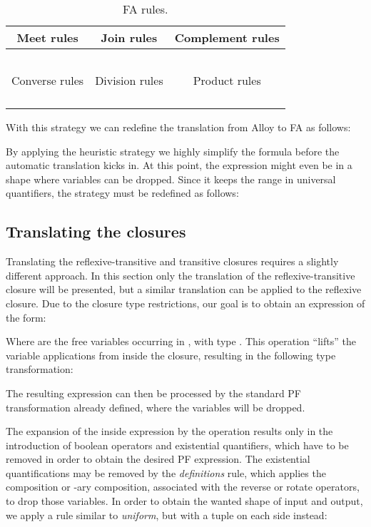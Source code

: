 \documentclass{llncs}
\begin{document}
\begin{table}[t]
\center
\begin{tabular}{|c|c|c|}
\hline
Meet rules & Join rules & Complement rules\\
\hline
 &  &   \\
 &  &  \\
 &  &  \\
 &  &    \\
 &  &   \\
\hline
Converse rules & Division rules & Product rules\\
\hline
 &  &  \\
 &  & \\
 &  &   \\
 &  &  \\
\hline
\end{tabular}
\caption{FA rules.}
\label{tab:rlrules}
\end{table}

With this strategy we can redefine the translation from Alloy to FA as follows:

By applying the heuristic strategy we highly simplify the formula
before the automatic translation kicks in. At this point, the
expression might even be in a shape where variables can be
dropped. Since it keeps the range in universal quantifiers, the
 strategy must be redefined as follows:


\subsection{Translating the closures}
Translating the reflexive-transitive and transitive closures requires a slightly different approach. In this section only the translation of the reflexive-transitive closure will be presented, but a similar translation can be applied to the reflexive closure. Due to the closure type restrictions, our goal is to obtain an expression of the form:

Where  are the  free variables occurring in , with type . This operation ``lifts'' the variable applications from inside the closure, resulting in the following type transformation:

The resulting expression can then be processed by the standard PF transformation already defined, where the variables will be dropped.

The expansion of the inside expression by the  operation results only in the introduction of boolean operators and existential quantifiers, which have to be removed in order to obtain the desired PF expression. The existential quantifications may be removed by the \emph{definitions} rule, which applies the composition or -ary composition, associated with the reverse or rotate operators, to drop those variables. In order to obtain the wanted shape of input and output, we apply a rule similar to \emph{uniform}, but with a tuple on each side instead:
\end{document}
